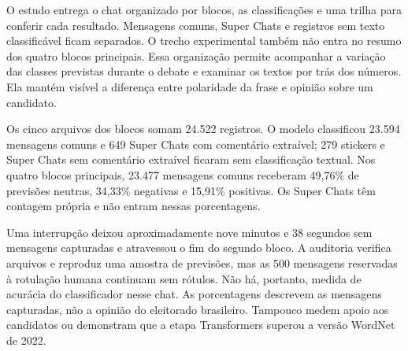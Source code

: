 O estudo entrega o chat organizado por blocos, as classificações e uma trilha para conferir cada resultado. Mensagens comuns, Super Chats e registros sem texto classificável ficam separados. O trecho experimental também não entra no resumo dos quatro blocos principais. Essa organização permite acompanhar a variação das classes previstas durante o debate e examinar os textos por trás dos números. Ela mantém visível a diferença entre polaridade da frase e opinião sobre um candidato.

Os cinco arquivos dos blocos somam 24.522 registros. O modelo classificou 23.594 mensagens comuns e 649 Super Chats com comentário extraível; 279 stickers e Super Chats sem comentário extraível ficaram sem classificação textual. Nos quatro blocos principais, 23.477 mensagens comuns receberam 49,76\% de previsões neutras, 34,33\% negativas e 15,91\% positivas. Os Super Chats têm contagem própria e não entram nessas porcentagens.

Uma interrupção deixou aproximadamente nove minutos e 38 segundos sem mensagens capturadas e atravessou o fim do segundo bloco. A auditoria verifica arquivos e reproduz uma amostra de previsões, mas as 500 mensagens reservadas à rotulação humana continuam sem rótulos. Não há, portanto, medida de acurácia do classificador nesse chat. As porcentagens descrevem as mensagens capturadas, não a opinião do eleitorado brasileiro. Tampouco medem apoio aos candidatos ou demonstram que a etapa Transformers superou a versão WordNet de 2022.
